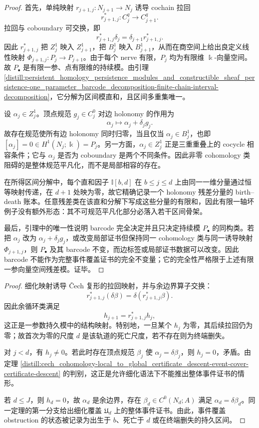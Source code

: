 \begin{proof}
首先，单纯映射 \(r_{j+1,j}:N_{j+1}\to N_j\) 诱导 cochain 拉回
\[
r_{j+1,j}^*:C^q_j\to C^q_{j+1}.
\]
拉回与 coboundary 可交换，即
\[
r_{j+1,j}^*\delta_j=\delta_{j+1}r_{j+1,j}^*.
\]
因此 \(r_{j+1,j}^*\) 把 \(Z^1_j\) 映入 \(Z^1_{j+1}\)，把 \(B^1_j\) 映入 \(B^1_{j+1}\)，从而在商空间上给出良定义线性映射 \(\Phi_{j+1,j}:P_j\to P_{j+1}\)。由于每个 nerve 有限，\(P_j\) 均为有限维 \(\Bbbk\)-向量空间。故 \(P_\bullet\) 是有限一参、点有限维的持续模。由引理 \ref{distill:persistent_homology_persistence_modules_and_constructible_sheaf_persistence-one_parameter_barcode_decomposition-finite-chain-interval-decomposition}，它分解为区间模直和，且区间多重集唯一。

设 \(\alpha_j\in Z^1_j\)。顶点规范 \(g_j\in C^0_j\) 对边 holonomy 的作用为
\[
\alpha_j\longmapsto \alpha_j+\delta_j g_j.
\]
故存在规范使所有边 holonomy 同时归零，当且仅当 \(\alpha_j\in B^1_j\)，也即 \([\alpha_j]=0\in H^1(N_j;\Bbbk)=P_j\)。另一方面，\(\alpha_j\in Z^1_j\) 正是三重重叠上的 cocycle 相容条件；它与 \(\alpha_j\) 是否为 coboundary 是两个不同条件。因此非零 cohomology 类阻碍的是整体规范平凡化，而不是局部相容的存在。

在所得区间分解中，每个直和因子 \(\mathbb I[b,d]\) 在 \(b\le j\le d\) 上由同一一维分量通过恒等映射传递，在 \(d+1\) 处映为零，故它精确记录一个 holonomy 残差分量的 birth--death 账本。任意残差类在该直和分解下写成这些分量的有限和，因此有限一轴坏例子没有额外形态：其不可规范平凡化部分必落入若干区间骨架。

最后，引理中的唯一性说明 barcode 完全决定并且只决定持续模 \(P_\bullet\) 的同构类。若把 \(\alpha_j\) 改为 \(\alpha_j+\delta_j g_j\)，或改变局部证书但保持同一 cohomology 类与同一诱导映射 \(\Phi_{j+1,j}\)，则 \(P_\bullet\) 及其 barcode 不变，而边标签或局部证书数据可以改变。因此 barcode 不能作为完整事件覆盖证书的完全不变量；它的完全性严格限于上述有限一参向量空间残差模。证毕。
\end{proof}

\begin{proof}
细化映射诱导 \v Cech 复形的拉回映射，并与余边界算子交换：
\[
r_{j+1,j}^{\ast}(\delta\beta)=\delta(r_{j+1,j}^{\ast}\beta).
\]
因此余循环类满足
\[
h_{j+1}=r_{j+1,j}^{\ast}h_j,
\]
这正是一参数持久模中的结构映射。特别地，一旦某个 \(h_j\) 为零，其后续拉回仍为零；故首次为零的尺度 \(d\) 是该轨道的死亡尺度，若不存在则为终端删失。

对 \(j<d\)，有 \(h_j\ne0\)。若此时存在顶点规范 \(\beta_j\) 使 \(\alpha_j=\delta\beta_j\)，则 \(h_j=0\)，矛盾。由定理 \ref{distill:cech_cohomology-local_to_global_certificate_descent-event-cover-certificate-descent} 的判别，这正是允许细化语法下不能推出整体事件证书的情形。

若 \(d\le J\)，则 \(h_d=0\)，故 \(\alpha_d\) 是余边界，存在 \(\beta_d\in C^0(N_d;A)\) 满足 \(\alpha_d=\delta\beta_d\)。同一定理的第一分支给出细化覆盖 \(\mathfrak U_d\) 上的整体事件证书。由此，事件覆盖 obstruction 的状态被记录为出生于 \(b\)、死亡于 \(d\) 或在终端删失的持久区间。
\end{proof}

